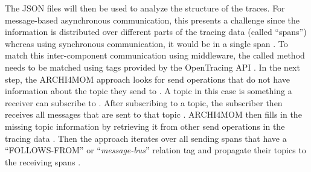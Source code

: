 The JSON files will then be used to analyze the structure of the traces.
For message-based asynchronous communication, this presents a challenge since the information is distributed over different parts of the tracing data (called ``spans'') whereas using synchronous communication, it would be in a single span \cite{Singh2022ARCHI4MOM}.
To match this inter-component communication using middleware, the called method needs to be matched using tags provided by the OpenTracing API \cite{Singh2022ARCHI4MOM}.
In the next step, the ARCHI4MOM approach looks for send operations that do not have information about the topic they send to \cite{Singh2022ARCHI4MOM}.
A topic in this case is something a receiver can subscribe to \cite{Singh2022ARCHI4MOM}.
After subscribing to a topic, the subscriber then receives all messages that are sent to that topic \cite{Singh2022ARCHI4MOM}.
ARCHI4MOM then fills in the missing topic information by retrieving it from other send operations in the tracing data \cite{Singh2022ARCHI4MOM}.
Then the approach iterates over all sending spans that have a ``FOLLOWS-FROM'' or ``\textit{message-bus}'' relation tag and propagate their topics to the receiving spans \cite{Singh2022ARCHI4MOM}.

